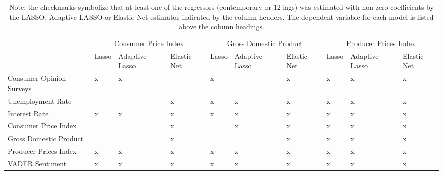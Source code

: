 \begin{landscape}
\begin{table}[]
\begin{adjustbox}{max width=\linewidth}
\begin{tabular}{llllllllll}
                         & \multicolumn{3}{c}{Consumer Price Index}       & \multicolumn{3}{c}{Gross Domestic Product} & \multicolumn{3}{c}{Producer Prices Index} \\
                         & Lasso     & Adaptive Lasso    & Elastic Net    & Lasso    & Adaptive Lasso   & Elastic Net  & Lasso   & Adaptive Lasso   & Elastic Net  \\
Consumer Opinion Surveys & x         & x                 &                & x        &                  & x            & x       & x                & x            \\
Unemployment Rate        &           &                   & x              & x        & x                & x            & x       & x                & x            \\
Interest Rate            & x         & x                 & x              & x        & x                & x            & x       & x                & x            \\
Consumer Price Index     &           &                   & x              &          & x                & x            & x       & x                & x            \\
Gross Domestic Product   &           &                   & x              &          &                  & x            & x       & x                & x            \\
Producer Prices Index    & x         & x                 & x              & x        & x                & x            & x       & x                & x            \\ \hline
VADER Sentiment          & x         & x                 & x              & x        & x                & x            & x       & x                & x \\ \hline    
\end{tabular}
\end{adjustbox}
\caption*{Note: the checkmarks symbolize that at least one of the regressors (contemporary or 12 lags) was estimated with non-zero coefficients by the LASSO, Adaptive LASSO or Elastic Net estimator indicated by the column headers. The dependent variable for each model is listed above the column headings.}
\end{table}
\end{landscape}

